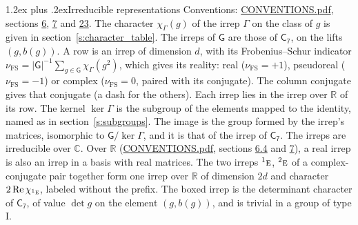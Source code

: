 \documentclass[10pt,a4paper]{article}
\makeatletter
\renewcommand\section{\@startsection{section}{1}{\z@}{-3ex plus -1ex minus -.2ex}%
  {1.2ex plus .2ex}{\normalfont\large\sffamily\bfseries\color{parttitle}}}
\numberwithin{equation}{section}
\newcommand{\grp}[1]{\mathsf{#1}}
\newcommand{\irr}[1]{\text{\normalfont\scshape #1}}
\newcommand{\conjpair}[1]{{}^{#1}}
\newcommand{\irchar}[1]{\chi_{#1}}
\newcommand{\fsind}{\nu_{\mathrm{FS}}}
\makeatother
\begin{document}
\section{Irreducible representations}\label{s:irreps}
Conventions: \href{../../CONVENTIONS.pdf}{CONVENTIONS.pdf}, sections \href{../../../rotation/CONVENTIONS.pdf\#conv.6}{6}, \href{../../../rotation/CONVENTIONS.pdf\#conv.7}{7} and \href{../../CONVENTIONS.pdf\#conv.23}{23}.
\leavevmode\label{n:function.character}\label{n:irrep.Gamma}The character $\irchar{\Gamma}(g)$ of the irrep $\Gamma$ on the class of $g$ is given in section~\ref{s:character_table}. The irreps of $\grp{G}$ are those of \href{../../../rotation/data/pdf/C7.pdf}{$\grp{C_{7}}$}, on the lifts $(g, b(g))$.
\leavevmode\label{n:index.dimension}\label{n:index.frobenius}\label{n:head.irrep}\label{n:head.reality}A row is an irrep of dimension $d$, with its Frobenius--Schur indicator $\fsind = |\grp{G}|^{-1}\allowbreak\sum_{g\in\grp{G}}\irchar{\Gamma}(g^2)$, which gives its reality: real ($\fsind = +1$), pseudoreal ($\fsind = -1$) or complex ($\fsind = 0$, paired with its conjugate). \label{n:head.conjugate}The column conjugate gives that conjugate (a dash for the others). \label{n:head.over.real}Each irrep lies in the irrep over $\mathbb{R}$ of its row. \label{n:head.kernel}The kernel $\ker\Gamma$ is the subgroup of the elements mapped to the identity, named as in section~\ref{s:subgroups}. \label{n:head.image}The image is the group formed by the irrep's matrices, isomorphic to $\grp{G}/\ker\Gamma$, and it is that of the irrep of \href{../../../rotation/data/pdf/C7.pdf}{$\grp{C_{7}}$}. The irreps are irreducible over $\mathbb{C}$. Over $\mathbb{R}$ (\href{../../CONVENTIONS.pdf}{CONVENTIONS.pdf}, sections \href{../../../rotation/CONVENTIONS.pdf\#conv.6.4}{6.4} and \href{../../../rotation/CONVENTIONS.pdf\#conv.7}{7}), a real irrep is also an irrep in a basis with real matrices. The two irreps $\conjpair{1}\irr{e}$, $\conjpair{2}\irr{e}$ of a complex-conjugate pair together form one irrep over $\mathbb{R}$ of dimension $2d$ and character $2\operatorname{Re}\irchar{\conjpair{1}\irr{e}}$, labeled without the prefix. \label{n:mark.determinant}The boxed irrep is the determinant character of \href{../../../rotation/data/pdf/C7.pdf}{$\grp{C_{7}}$}, of value $\det g$ on the element $(g, b(g))$, and is trivial in a group of type I.
\setlength{\emergencystretch}{2em}\par\setlength{\emergencystretch}{0pt}
\end{document}
